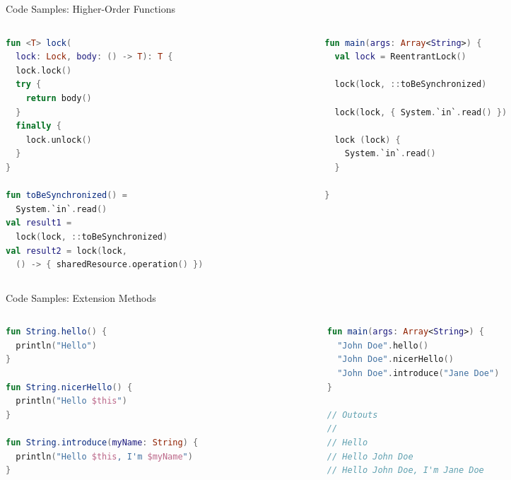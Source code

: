 \begin{frame}[fragile]{Code Samples: Higher-Order Functions}
	\begin{columns}
		\begin{column}{0.55\textwidth}
\begin{lstlisting}[language=Kotlin,basicstyle=\ttfamily\scriptsize]
fun <T> lock(
  lock: Lock, body: () -> T): T {
  lock.lock()
  try {
    return body()
  }
  finally {
    lock.unlock()
  }
}

fun toBeSynchronized() =
  System.`in`.read()
val result1 =
  lock(lock, ::toBeSynchronized)
val result2 = lock(lock,
  () -> { sharedResource.operation() })
\end{lstlisting}
		\end{column}
		\begin{column}{0.45\textwidth}
\begin{lstlisting}[language=Kotlin,basicstyle=\ttfamily\scriptsize]
fun main(args: Array<String>) {
  val lock = ReentrantLock()

  lock(lock, ::toBeSynchronized)

  lock(lock, { System.`in`.read() })

  lock (lock) {
    System.`in`.read()
  }

}
\end{lstlisting}
		\end{column}
	\end{columns}
\end{frame}

\begin{frame}[fragile]{Code Samples: Extension Methods}
	\begin{columns}
		\begin{column}{0.5\textwidth}
\begin{lstlisting}[language=Kotlin,basicstyle=\ttfamily\scriptsize]
fun String.hello() {
  println("Hello")
}

fun String.nicerHello() {
  println("Hello $this")
}

fun String.introduce(myName: String) {
  println("Hello $this, I'm $myName")
}
\end{lstlisting}
		\end{column}
		\begin{column}{0.5\textwidth}
\begin{lstlisting}[language=Kotlin,basicstyle=\ttfamily\scriptsize]
fun main(args: Array<String>) {
  "John Doe".hello()
  "John Doe".nicerHello()
  "John Doe".introduce("Jane Doe")
}

// Outouts
//
// Hello
// Hello John Doe
// Hello John Doe, I'm Jane Doe
\end{lstlisting}
		\end{column}
	\end{columns}
\end{frame}

